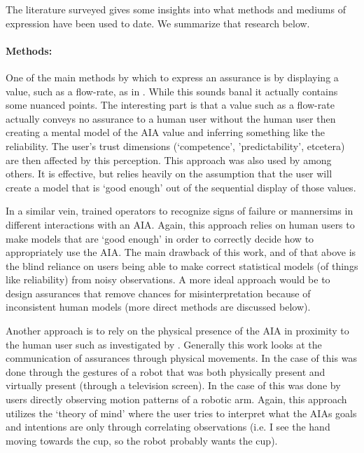     The literature surveyed gives some insights into what methods and mediums of expression have been used to date. We summarize that research below.

    \paragraph{Methods:} One of the main methods by which to express an assurance is by displaying a value, such as a flow-rate, as in \cite{Muir1996-gt}. While this sounds banal it actually contains some nuanced points. The interesting part is that a value such as a flow-rate actually conveys no assurance to a human user without the human user then creating a mental model of the AIA value and inferring something like the reliability. The user's trust dimensions (`competence', 'predictability', etcetera) are then affected by this perception. This approach was also used by \cite{Wickens1999-la,Sheridan1984-kx,Hutchins2015-if} among others. It is effective, but relies heavily on the assumption that the user will create a model that is `good enough' out of the sequential display of those values.

    In a similar vein, \cite{Freedy2007-sg,Desai2012-rc,Salem2015-md} trained operators to recognize signs of failure or mannersims in different interactions with an AIA. Again, this approach relies on human users to make models that are `good enough' in order to correctly decide how to appropriately use the AIA. The main drawback of this work, and of that above is the blind reliance on users being able to make correct statistical models (of things like reliability) from noisy observations. A more ideal approach would be to design assurances that remove chances for misinterpretation because of inconsistent human models (more direct methods are discussed below).

    Another approach is to rely on the physical presence of the AIA in proximity to the human user such as investigated by \cite{Bainbridge2011-pl, Dragan2013-wd}. Generally this work looks at the communication of assurances through physical movements. In the case of \cite{Bainbridge2011-pl} this was done through the gestures of a robot that was both physically present and virtually present (through a television screen). In the case of \cite{Dragan2013-wd} this was done by users directly observing motion patterns of a robotic arm. Again, this approach utilizes the `theory of mind' where the user tries to interpret what the AIAs goals and intentions are only through correlating observations (i.e. I see the hand moving towards the cup, so the robot probably wants the cup).

